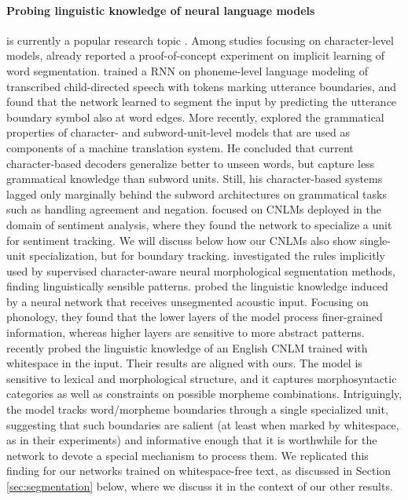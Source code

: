 \paragraph{Probing linguistic knowledge of neural language models} is
currently a popular research topic
\cite{Li:etal:2016,Linzen:etal:2016,Shi:etal:2016,Adi:etal:2017,Belinkov:etal:2017,Kadar:etal:2017,Hupkes:etal:2017,Conneau:etal:2018,Ettinger:etal:2018,Linzen:etal:2018}. Among
studies focusing on character-level models, 
 already reported a proof-of-concept experiment on
implicit learning of word
segmentation.  trained a RNN on
phoneme-level language modeling of transcribed child-directed speech
with tokens marking utterance boundaries, and found that the network
learned to segment the input by predicting the utterance boundary
symbol also at word edges. More recently, 
explored the grammatical properties of character- and
subword-unit-level models that are used as components of a machine
translation system. He concluded that current character-based decoders
generalize better to unseen words, but capture less grammatical
knowledge than subword units. Still, his character-based systems
lagged only marginally behind the subword architectures on grammatical
tasks such as handling agreement and
negation.  focused on CNLMs
deployed in the domain of sentiment analysis, where they found the
network to specialize a unit for sentiment tracking. We will discuss
below how our CNLMs also show single-unit specialization, but for boundary
tracking.  investigated the rules implicitly
used by supervised character-aware neural morphological segmentation
methods, finding linguistically sensible
patterns.  probed the linguistic knowledge
induced by a neural network that receives unsegmented acoustic
input. Focusing on phonology, they found that the lower layers of the model process finer-grained information,
whereas higher layers are sensitive to more abstract
patterns. %
 recently probed the linguistic
knowledge of an English CNLM trained with whitespace in the
input. Their results are aligned with ours. The model is sensitive to
lexical and morphological structure, and it captures morphosyntactic
categories as well as constraints on possible morpheme
combinations. Intriguingly, the model tracks word/morpheme boundaries
through a single specialized unit, suggesting that such boundaries are
salient (at least when marked by whitespace, as in their experiments)
and informative enough that it is worthwhile for the network to devote a
special mechanism to process them. We replicated this finding for our
networks trained on whitespace-free text, as discussed in Section
\ref{sec:segmentation} below, where we discuss it in the context of our
other results.


